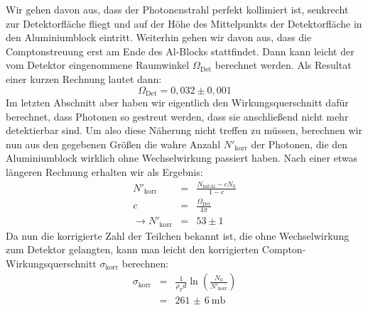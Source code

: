 Wir gehen davon aus, dass der Photonenstrahl perfekt kollimiert ist, senkrecht
zur Detektorfläche fliegt und auf der Höhe des Mittelpunkts der Detektorfläche
in den Aluminiumblock eintritt. Weiterhin gehen wir davon aus, dass die
Comptonstreuung erst am Ende des Al-Blocks stattfindet. Dann kann leicht der vom
Detektor eingenommene Raumwinkel $\Omega_{\mathrm{Det}}$ berechnet werden. Als
Resultat einer kurzen Rechnung lautet dann:
\begin{equation}
\Omega_{\mathrm{Det}} = 0,032 \pm 0,001
\end{equation}
Im letzten Abschnitt aber haben wir eigentlich den Wirkungsquerschnitt dafür
berechnet, dass Photonen so gestreut werden, dass sie anschließend nicht mehr
detektierbar sind. Um also diese Näherung nicht treffen zu müssen, berechnen wir
nun aus den gegebenen Größen die wahre Anzahl $N'_{\mathrm{korr}}$ der Photonen,
die den Aluminiumblock wirklich ohne Wechselwirkung passiert haben. Nach einer
etwas längeren Rechnung erhalten wir als Ergebnis:
\begin{eqnarray}
N'_{\mathrm{korr}} &=& \frac{N_{\mathrm{mit Al}}-cN_0}{1-c}\\
c &=& \frac{\Omega_{\mathrm{Det}}}{4\pi}\\
\rightarrow N'_{\mathrm{korr}} &=& 53 \pm 1
\end{eqnarray}
Da nun die korrigierte Zahl der Teilchen bekannt ist, die ohne Wechselwirkung
zum Detektor gelangten, kann man leicht den korrigierten
Compton-Wirkungsquerschnitt $\sigma_{\mathrm{korr}}$ berechnen:
\begin{eqnarray}
\sigma_{\mathrm{korr}} &=& \frac{1}{\rho_T
d}\ln\left(\frac{N_0}{N'_{\mathrm{korr}}}\right)\\
&=& \SI{261(6)}{\milli\barn}
\end{eqnarray}